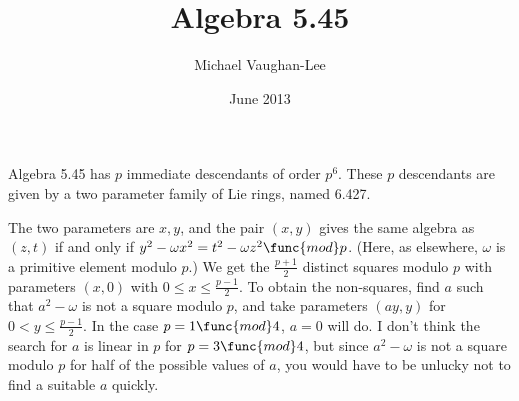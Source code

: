 \documentclass[12pt]{article}
\begin{document}
\title{Algebra 5.45}
\author{Michael Vaughan-Lee}
\date{June 2013}
\maketitle

Algebra 5.45 has $p$ immediate descendants of order $p^{6}$. These $p$
descendants are given by a two parameter family of Lie rings, named 6.427.

The two parameters are $x,y$, and the pair $(x,y)$ gives the same algebra as 
$(z,t)$ if and only if $y^{2}-\omega x^{2}=t^{2}-\omega z^{2}\func{mod}p$.
(Here, as elsewhere, $\omega $ is a primitive element modulo $p$.) We get
the $\frac{p+1}{2}$ distinct squares modulo $p$ with parameters $(x,0)$ with 
$0\leq x\leq \frac{p-1}{2}$. To obtain the non-squares, find $a$ such that $%
a^{2}-\omega $ is not a square modulo $p$, and take parameters $(ay,y)$ for $%
0<y\leq \frac{p-1}{2}$. In the case $p=1\func{mod}4$, $a=0$ will do. I don't
think the search for $a$ is linear in $p$ for $p=3\func{mod}4$, but since $%
a^{2}-\omega $ is not a square modulo $p$ for half of the possible values of 
$a$, you would have to be unlucky not to find a suitable $a$ quickly.
\end{document}
